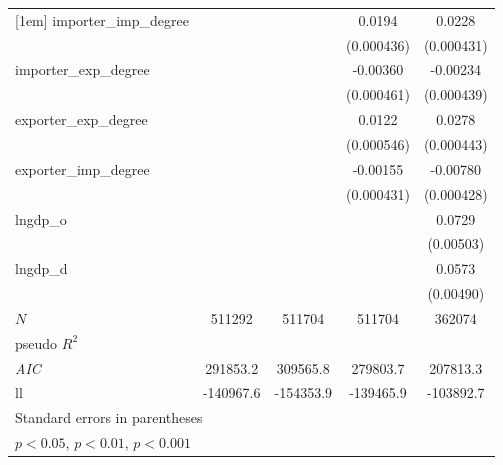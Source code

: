 {\begin{tabular}{l*{4}{c}}
[1em]
importer\_imp\_degree&                  &                  &   0.0194\sym{***}&   0.0228\sym{***}\\
          &                  &                  &(0.000436)         &(0.000431)         \\
[1em]
importer\_exp\_degree&                  &                  & -0.00360\sym{***}& -0.00234\sym{***}\\
          &                  &                  &(0.000461)         &(0.000439)         \\
[1em]
exporter\_exp\_degree&                  &                  &   0.0122\sym{***}&   0.0278\sym{***}\\
          &                  &                  &(0.000546)         &(0.000443)         \\
[1em]
exporter\_imp\_degree&                  &                  & -0.00155\sym{***}& -0.00780\sym{***}\\
          &                  &                  &(0.000431)         &(0.000428)         \\
[1em]
lngdp\_o   &                  &                  &                  &   0.0729\sym{***}\\
          &                  &                  &                  &(0.00503)         \\
[1em]
lngdp\_d   &                  &                  &                  &   0.0573\sym{***}\\
          &                  &                  &                  &(0.00490)         \\
\hline
\(N\)     &   511292         &   511704         &   511704         &   362074         \\
pseudo \(R^{2}\)&                  &                  &                  &                  \\
\textit{AIC}& 291853.2         & 309565.8         & 279803.7         & 207813.3         \\
ll        &-140967.6         &-154353.9         &-139465.9         &-103892.7         \\
\hline\hline
\multicolumn{5}{l}{\footnotesize Standard errors in parentheses}\\
\multicolumn{5}{l}{\footnotesize \sym{*} \(p<0.05\), \sym{**} \(p<0.01\), \sym{***} \(p<0.001\)}\\
\end{tabular}
}
